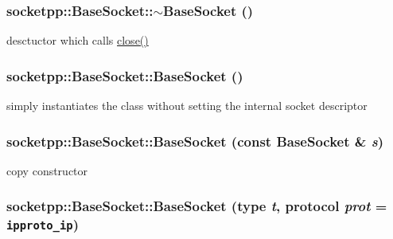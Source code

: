 \begin{CompactItemize}
{\subsubsection[{$\sim$BaseSocket}]{\setlength{\rightskip}{0pt plus 5cm}socketpp::BaseSocket::$\sim$BaseSocket ()}}
\label{classsocketpp_1_1BaseSocket_2e066addfaa6f5648e68b3e6b0a15e79}


desctuctor which calls \hyperlink{classsocketpp_1_1BaseSocket_f067195056bb6b5a65c4bc1d2ac7da72}{close()} 

\hypertarget{classsocketpp_1_1BaseSocket_3eb81ecbf94ce83afa6b2f60206c77f2}{
\subsubsection[{BaseSocket}]{\setlength{\rightskip}{0pt plus 5cm}socketpp::BaseSocket::BaseSocket ()}}
\label{classsocketpp_1_1BaseSocket_3eb81ecbf94ce83afa6b2f60206c77f2}


simply instantiates the class without setting the internal socket descriptor 

\hypertarget{classsocketpp_1_1BaseSocket_0c142db99422572579c91f3e176035c6}{
\subsubsection[{BaseSocket}]{\setlength{\rightskip}{0pt plus 5cm}socketpp::BaseSocket::BaseSocket (const {\bf BaseSocket} \& {\em s})}}
\label{classsocketpp_1_1BaseSocket_0c142db99422572579c91f3e176035c6}


copy constructor 

\hypertarget{classsocketpp_1_1BaseSocket_35c982d7aef2041c100439cf38aa7f4d}{
\subsubsection[{BaseSocket}]{\setlength{\rightskip}{0pt plus 5cm}socketpp::BaseSocket::BaseSocket ({\bf type} {\em t}, \/  {\bf protocol} {\em prot} = {\tt ipproto\_\-ip})}}
\label{classsocketpp_1_1BaseSocket_35c982d7aef2041c100439cf38aa7f4d}



\end{CompactItemize}
